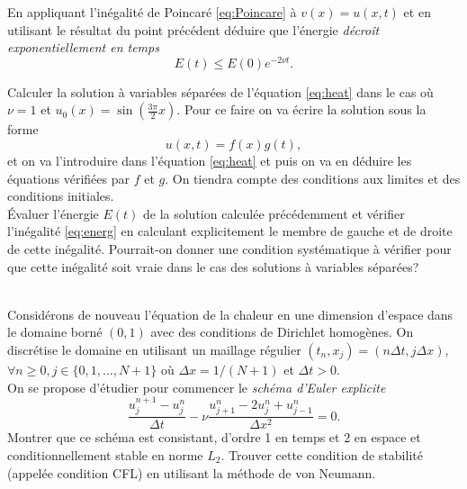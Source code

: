 \documentclass[12pt,a4paper]{article}
\begin{document}
 En appliquant l'in\'egalit\'e de Poincar\'e \eqref{eq:Poincare} \`a $v(x)= u(x,t)$ et en utilisant le résultat du point précédent d\'eduire que l'\'energie {\it d\'ecro\^it exponentiellement en temps} %
\begin{equation} \label{eq:energ}
E(t) \le E(0)e^{-2\nu t}.
\end{equation}

 Calculer la solution à variables séparées de l'équation \eqref{eq:heat} dans le cas où $\nu=1$ et $u_0(x) = \sin(\frac{3\pi}{2}x)$. Pour ce faire on va écrire la solution sous la forme 
$$
u(x,t) = f(x)g(t),
$$
et on va l'introduire dans l'équation \eqref{eq:heat} et puis on va en déduire les équations vérifiées par $f$ et $g$. On tiendra compte des conditions aux limites et des conditions initiales. \\%

  Évaluer l'énergie $E(t)$ de la solution calculée précédemment et vérifier l'inégalité \eqref{eq:energ} en calculant explicitement le membre de gauche et de droite de cette inégalité. Pourrait-on donner une condition systématique à vérifier pour que cette inégalité soit vraie dans le cas des solutions à variables séparées? %

\newpage
{} \\ %

\noindent Consid\'erons de nouveau l'\'equation de la chaleur en une dimension d'espace dans le domaine born\'e $(0,1)$ avec des conditions de Dirichlet homogènes. On discr\'etise le domaine en utilisant un maillage r\'egulier
$(t_n,x_j)=(n\Delta t,j\Delta x)$,  $\forall n\ge 0,j\in\{0,1,...,N+1\}$ o\`u $\Delta x=1/(N+1)$ et $\Delta t>0$. \\

  On se propose d'étudier pour commencer le {\it sch\'ema d'Euler explicite}
$$
\frac{u_j^{n+1}-u_j^n}{\Delta t}-\nu \frac{u_{j+1}^{n}-2u_j^n+u_{j-1}^{n}}{\Delta x^2}=0.
$$
Montrer que ce schéma est consistant, d'ordre 1 en temps et 2 en espace et conditionnellement stable en norme $L_2$. Trouver cette condition de stabilité (appelée condition CFL) en utilisant la méthode de von Neumann.  \\%
\end{document}

